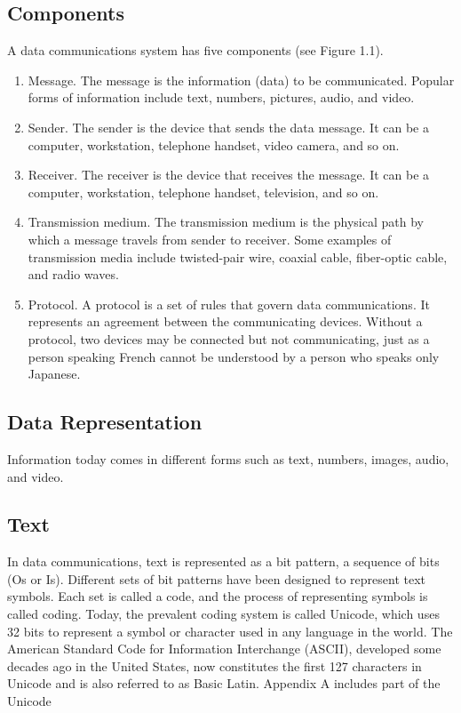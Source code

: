 \subsection{Components}
A data communications system has five components (see Figure 1.1).
\begin{enumerate}
  \item Message. The message is the information (data) to be communicated. Popular forms of information include text, numbers, pictures, audio, and video.
  \item Sender. The sender is the device that sends the data message. It can be a computer, workstation, telephone handset, video camera, and so on.
  \item Receiver. The receiver is the device that receives the message. It can be a computer, workstation, telephone handset, television, and so on.
  \item Transmission medium. The transmission medium is the physical path by which a message travels from sender to receiver. Some examples of transmission media include twisted-pair wire, coaxial cable, fiber-optic cable, and radio waves.
  \item Protocol. A protocol is a set of rules that govern data communications. It represents an agreement between the communicating devices. Without a protocol, two devices may be connected but not communicating, just as a person speaking French cannot be understood by a person who speaks only Japanese.
\end{enumerate}

\subsection{Data Representation}
Information today comes in different forms such as text, numbers, images, audio, and video.

\subsection*{Text}
In data communications, text is represented as a bit pattern, a sequence of bits (Os or Is). Different sets of bit patterns have been designed to represent text symbols. Each set is called a code, and the process of representing symbols is called coding. Today, the prevalent coding system is called Unicode, which uses 32 bits to represent a symbol or character used in any language in the world. The American Standard Code for Information Interchange (ASCII), developed some decades ago in the United States, now constitutes the first 127 characters in Unicode and is also referred to as Basic Latin. Appendix A includes part of the Unicode

